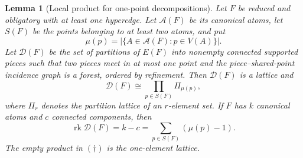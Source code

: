 \documentclass[a4paper,11pt,reqno]{amsart}
\theoremstyle{plain}
\newtheorem{lemma}[theorem]{Lemma}
\theoremstyle{definition}
\theoremstyle{remark}
\begin{document}
\begin{lemma}[Local product for one-point decompositions]
\label{lemma-local-decomposition-lattice-product}
Let $F$ be reduced and obligatory with at least one hyperedge.  Let
$\mathcal A(F)$ be its canonical atoms, let $S(F)$ be the points belonging to
at least two atoms, and put
\[
 \mu(p)=|\{A\in\mathcal A(F):p\in V(A)\}|.
\]
Let $\mathcal D(F)$ be the set of partitions of $E(F)$ into nonempty connected
supported pieces such that two pieces meet in at most one point and the
piece--shared-point incidence graph is a forest, ordered by refinement.  Then
$\mathcal D(F)$ is a lattice and
\[
 \mathcal D(F)\cong\prod_{p\in S(F)}\Pi_{\mu(p)},
 \tag{\(\dagger\)}
\]
where $\Pi_r$ denotes the partition lattice of an $r$-element set.  If $F$
has $k$ canonical atoms and $c$ connected components, then
\[
 \operatorname{rk}\mathcal D(F)=k-c
   =\sum_{p\in S(F)}(\mu(p)-1).
 \tag{\(\ddagger\)}
\]
The empty product in \((\dagger)\) is the one-element lattice.
\end{lemma}
\end{document}

